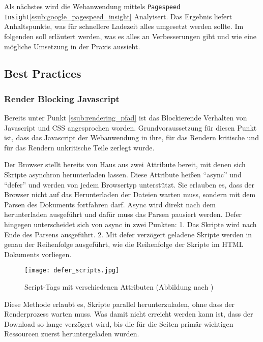 		Als nächstes wird die Webanwendung mittels \texttt{Pagespeed Insight}\ref{ssub:google_pagespeed_insight} Analyisert. Das Ergebnis liefert Anhaltspunkte, was für schnellere Ladezeit alles umgesetzt werden sollte. Im folgenden soll erläutert werden, was es alles an Verbesserungen gibt und wie eine mögliche Umsetzung in der Praxis aussieht.

		
		\subsection{Best Practices}
		\label{sub:best_practices}
		
			\subsubsection{Render Blocking Javascript} %
			\label{ssub:render_blocking_javascript}
				Bereits unter Punkt \ref{ssub:rendering_pfad} ist das Blockierende Verhalten von Javascript und CSS angesprochen worden. Grundvoraussetzung für diesen Punkt ist, dass das Javascript der Webanwendung in ihre, für das Rendern kritische und für das Rendern unkritische Teile zerlegt wurde. 

				Der Browser stellt bereits von Haus aus zwei Attribute bereit, mit denen sich Skripte asynchron herunterladen lassen. Diese Attribute heißen "`async"' und "`defer"' und werden von jedem Browsertyp unterstützt.\autocite{canIuse} Sie erlauben es, dass der Browser nicht auf das Herunterladen der Dateien warten muss, sondern mit dem Parsen des Dokuments fortfahren darf. Async wird direkt nach dem herunterladen ausgeführt und dafür muss das Parsen pausiert werden. Defer hingegen unterscheidet sich von async in zwei Punkten: 1. Das Skripte wird nach Ende des Parsens ausgeführt. 2. Mit defer verzögert geladene Skripte werden in genau der Reihenfolge ausgeführt, wie die Reihenfolge der Skripte im HTML Dokuments vorliegen.
				
				\begin{figure}[htbp]
					\begin{center}
						\texttt{[image: defer\_scripts.jpg]}
						\caption{Script-Tags mit verschiedenen Attributen (Abbildung nach \autocite{growing})}
						\label{fig:defer_scripts}
					\end{center}
				\end{figure}

				Diese Methode erlaubt es, Skripte parallel herunterzuladen, ohne dass der Renderprozess warten muss. Was damit nicht erreicht werden kann ist, dass der Download so lange verzögert wird, bis die für die Seiten primär wichtigen Ressourcen zuerst heruntergeladen wurden.\\

